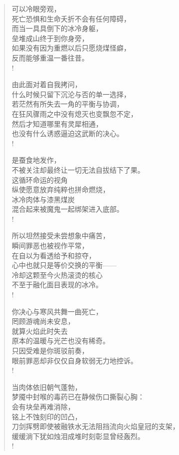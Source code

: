 \documentclass[UTF8, 12pt, a4paper]{ctexrep} %
\begin{document}
\begin{verse}
    可以冷眼旁观，\\
    死亡恐惧和生命夭折不会有任何障碍，\\
    而当一具具倒下的冰冷身躯，\\
    垒堆成山终于到你身旁，\\
    如果没有因为重燃以后只愿烧煤怪癖，\\
    反而能够重温一番往昔。\\!

    由此面对着自我拷问，\\
    什么时候只留下沉沦与否的单一选择，\\
    若茫然有所失去一角的平衡与协调，\\
    在狂风骤雨之中没有熄灭也变飘忽不定，\\
    然后才知道哪里有灵犀相通，\\
    也没有什么诱惑逼迫这武断的决心。\\!

    是蚕食地发作，\\
    不被关注却最终让一切无法自拔结下了果。\\
    这循环命运的视角\\
    纵使愿意放弃纯粹也拼命燃烧，\\
    冰冷肉体与漆黑煤炭\\
    混合起来被魔鬼一起绑架进入底部。\\!

    所以坦然接受未尝想象中痛苦，\\
    瞬间罪恶也被视作平常，\\
    在自以为看透给予和掠夺，\\
    心中也就只是等价交换的平衡——\\
    冷却这颗至今火热滚烫的核心\\
    不至于融化面目表现的冰冷。\\!

    你决心与寒风共舞一曲死亡，\\
    罔顾游魂尚未安息，\\
    就算火焰此时失去\\
    原本的温暖与光芒也没有稀奇。\\
    只因受难是你斑驳前奏，\\
    眼前罪恶却非仅仅自身软弱无力地控诉。\\!

    当肉体依旧朝气蓬勃，\\
    梦魇中封喉的毒药已在静候伤口撕裂心胸：\\
    会有块垒再难消除，\\
    铭上不蚀刻印的凹凸，\\
    刀剑挥劈即使被融铁水无法阻挡流向火焰皇冠的支架，\\
    缓缓淌下犹如烛泪成堆时刻彰显曾经轰烈。\\!


\end{verse}
\end{document}
